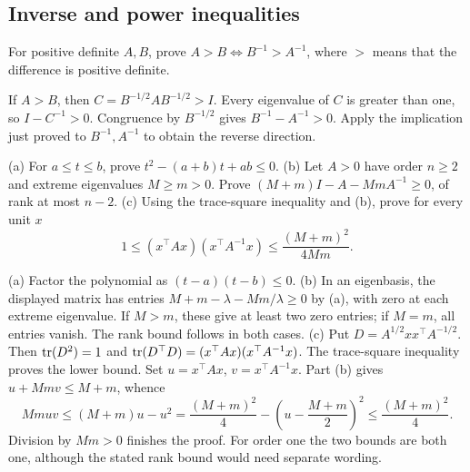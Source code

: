 \subsection*{Inverse and power inequalities}

\begin{problem}\label{ex:12:ineq-ma-16}
For positive definite \(A,B\), prove
\(A>B\iff B^{-1}>A^{-1}\), where \(>\) means that the difference is
positive definite.
\end{problem}
\begin{solution}
If \(A>B\), then \(C=B^{-1/2}AB^{-1/2}>I\). Every eigenvalue of \(C\)
is greater than one, so \(I-C^{-1}>0\). Congruence by \(B^{-1/2}\)
gives \(B^{-1}-A^{-1}>0\). Apply the implication just proved to
\(B^{-1},A^{-1}\) to obtain the reverse direction.
\end{solution}

\begin{problem}\label{ex:12:ineq-ma-17}
(a) For \(a\leqslant t\leqslant b\), prove \(t^2-(a+b)t+ab\leqslant0\).
(b) Let \(A>0\) have order \(n\geqslant2\) and extreme eigenvalues
\(M\geqslant m>0\). Prove \((M+m)I-A-MmA^{-1}\geqslant0\), of rank
at most \(n-2\).
(c) Using the trace-square inequality and (b), prove for every unit \(x\)
\[
1\leqslant(x^\top Ax)(x^\top A^{-1}x)\leqslant\frac{(M+m)^2}{4Mm}.
\]
\end{problem}
\begin{solution}
(a) Factor the polynomial as \((t-a)(t-b)\leqslant0\).
(b) In an eigenbasis, the displayed matrix has entries
\(M+m-\lambda-Mm/\lambda\geqslant0\) by (a), with zero at each
extreme eigenvalue. If \(M>m\), these give at least two zero entries;
if \(M=m\), all entries vanish. The rank bound follows in both cases.
(c) Put \(D=A^{1/2}xx^\top A^{-1/2}\). Then
\(\operatorname{tr}(D^2)=1\) and
\(\operatorname{tr}(D^\top D)=(x^\top Ax)(x^\top A^{-1}x)\).
The trace-square inequality proves the lower bound.
Set \(u=x^\top Ax\), \(v=x^\top A^{-1}x\).
Part (b) gives \(u+Mm v\leqslant M+m\), whence
\[
Mmuv\leqslant(M+m)u-u^2
=\frac{(M+m)^2}{4}-\left(u-\frac{M+m}{2}\right)^2
\leqslant\frac{(M+m)^2}{4}.
\]
Division by \(Mm>0\) finishes the proof. For order one the two bounds
are both one, although the stated rank bound would need separate wording.
\end{solution}

